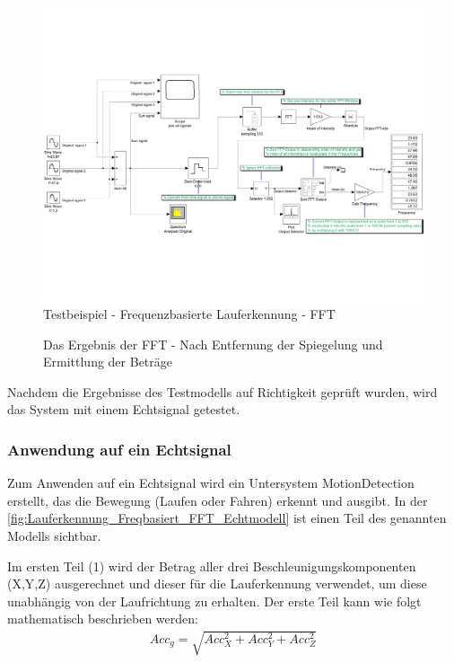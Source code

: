 \begin{landscape}
	\begin{figure}[htpb]
		\centering
		\includegraphics[width=\linewidth]{Bilder/Lauferkennung_FFT_Testmodell1.pdf}
		\caption{Testbeispiel - Frequenzbasierte Lauferkennung - FFT}
		\label{fig:Lauferkennung_Freqbasiert_FFT_Testmodell}
	\end{figure}
\end{landscape}

\begin{figure}[htpb]
	\centering 
	\caption{Das Ergebnis der FFT - Nach Entfernung der Spiegelung und Ermittlung der Beträge}
	\label{fig:FFT_Ergebnis_Skala_512}
\end{figure}

Nachdem die Ergebnisse des Testmodells auf Richtigkeit geprüft wurden, wird das System mit einem Echtsignal getestet. 

\subsubsection{Anwendung auf ein Echtsignal}

Zum Anwenden auf ein Echtsignal wird ein Untersystem \glqq MotionDetection\grqq{} erstellt, das die Bewegung (Laufen oder Fahren) erkennt und ausgibt.
In der \autoref{fig:Lauferkennung_Freqbasiert_FFT_Echtmodell} ist einen Teil des genannten Modells sichtbar. 

Im ersten Teil (1) wird der Betrag aller drei Beschleunigungskomponenten (X,Y,Z) ausgerechnet und dieser für die Lauferkennung verwendet, um diese unabhängig von der Laufrichtung zu erhalten. Der erste Teil kann wie folgt mathematisch beschrieben werden:
\begin{align*}
	Acc_g = \sqrt{ Acc_X^2 + Acc_Y^2 + Acc_Z^2}
\end{align*}

